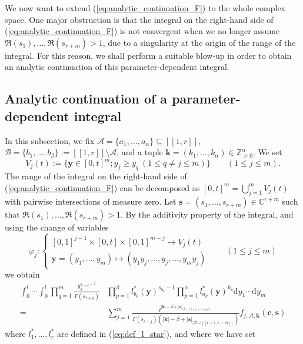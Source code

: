 \documentclass[a4paper]{amsart}
\theoremstyle{remark}
\theoremstyle{definition}
\newcommand{\dd}{\mathrm{d}}
\begin{document}
We now want to extend (\ref{eq:analytic_continuation_F}) to the whole complex space. One major obstruction is that the integral on the right-hand side of (\ref{eq:analytic_continuation_F}) is not convergent when we no longer assume $\Re(s_1),\ldots,\Re(s_{r+m}) > 1$, due to a singularity at the origin of the range of the integral. For this reason, we shall perform a suitable blow-up in order to obtain an analytic continuation of this parameter-dependent integral.

\subsection{Analytic continuation of a parameter-dependent integral}
\label{subsection:param_dependent_integral}

In this subsection, we fix $\mathcal{A}= \{ a_1,\ldots,a_{\alpha} \} \subseteq [\![ 1,r ]\!]$, $\mathcal{B}=\{ b_1,\ldots,b_{\beta} \} := [\![ 1,r ]\!] \setminus \mathcal{A}$, and a tuple $\mathbf{k}=(k_1,\ldots,k_{\alpha}) \in \mathbb{Z}_{\geq 0}^{\alpha}$. We set 
$$ V_j(t):=\big\{ \mathbf{y} \in [0,t]^{m};y_j \geq y_q \ (1 \leq q \neq j \leq m) \big\} \qquad (1 \leq j \leq m). $$
The range of the integral on the right-hand side of (\ref{eq:analytic_continuation_F}) can be decomposed as $[0,t]^m = \bigcup_{j=1}^m V_j(t)$ with pairwise intersections of measure zero. Let $\mathbf{s}=(s_1,\ldots,s_{r+m}) \in \mathbb{C}^{r+m}$ such that $\Re(s_1),\ldots,\Re(s_{r+m})>1$. By the additivity property of the integral, and using the change of variables
\[
    \varphi_j :
    \begin{cases}
        [0,1]^{j-1} \times [0,t] \times [0,1]^{m-j} \to V_j(t) \\
        \mathbf{y}=(y_1,\ldots,y_{m}) \mapsto (y_1y_j,\ldots,y_j,\ldots,y_{m}y_j)
    \end{cases}
    \qquad (1 \leq j \leq m)
\]
we obtain
\begin{align}
    \int_0^t \cdots \int_0^t \prod_{q=1}^{m} \frac{y_q^{s_{r+q}-1}}{\Gamma(s_{r+q})}& \prod_{p=1}^{\beta} l^*_{b_p}(\mathbf{y})^{s_{b_p}-1} \prod_{p=1}^{\alpha} l^*_{a_p}(\mathbf{y})^{k_p} \dd y_1 \cdots \dd y_{m} \nonumber \\
    =& \sum_{j=1}^{m} \frac{t^{|\mathbf{k}|-\beta+|\mathbf{s}|_{|\mathcal{B}\cup [\![ r+1,r+m ]\!]}}}{\Gamma(s_{r+j})(|\mathbf{k}|-\beta+|\mathbf{s}|_{|\mathcal{B}\cup [\![ r+1,r+m ]\!]})} f_{j,\mathcal{A},\mathbf{k}}(\mathbf{c},\mathbf{s}) \label{eq:relation_integral_after_blowup}
\end{align}
where $l^*_1,\ldots,l^*_r$ are defined in (\ref{eq:def_l_star}), and where we have set
\end{document}
